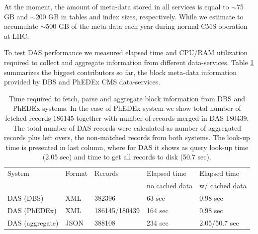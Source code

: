 \documentclass[1p,times]{elsarticle}
\begin{document}
At the moment, the amount of meta-data stored in all services is equal to
$\sim$75 GB and $\sim$200 GB in tables and index sizes, respectively. While 
we estimate to accumulate $\sim$500 GB of the meta-data each year during 
normal CMS operation at LHC.

To test DAS performance we measured elapsed time and CPU/RAM utilization
required to collect and aggregate information from different
data-services. Table \ref{DAS_benchmark} summarizes the biggest 
contributors so far, the block meta-data information provided by DBS and 
PhEDEx CMS data-services. 

\begin{table}[hbt]
\centering
\begin{tabular}{lllll}\hline
\hline
System & Format & Records & Elapsed time & Elapsed time \\
& & & no cached data & w/ cached data \\
\hline
DAS (DBS) & XML & 382396 & 63 sec & 0.98 sec \\
DAS (PhEDEx) & XML & 186145/180439 & 164 sec & 0.98 sec \\
DAS (aggregate) & JSON & 388108 & 234 sec & 2.05/50.7 sec \\
\hline
\hline
\end{tabular}
\caption{Time required to fetch, parse and aggregate block information
from DBS and PhEDEx systems. In the case of PhEDEx
system we show total number of fetched records 186145 together with
number of records merged in DAS 180439. The total number of DAS records 
were calculated as number of aggregated records plus left overs,
the non-matched records from both systems. The look-up time is presented in
last column, where for DAS it shows as query look-up time (2.05 sec) 
and time to get all records to disk (50.7 sec).}
\label{DAS_benchmark}
\end{table}
\end{document}
